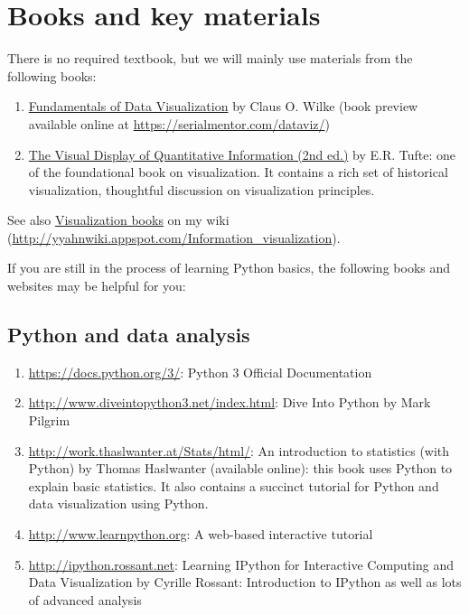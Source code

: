 \documentclass[11pt,article,oneside]{memoir} %
\begin{document}
\section{Books and key materials}%

There is no required textbook, but we will mainly use materials from the following books:

\begin{enumerate}
    
\item \href{https://serialmentor.com/dataviz/}{Fundamentals of Data Visualization} by Claus O. Wilke (book preview available online at \url{https://serialmentor.com/dataviz/})

\item \href{http://www.amazon.com/gp/product/0961392142}{The Visual Display of Quantitative Information (2nd ed.)} by E.R. Tufte: one of the foundational book on visualization. It contains a rich set of historical visualization, thoughtful discussion on visualization principles. 

\end{enumerate}

See also \href{http://yyahnwiki.appspot.com/Information_visualization#h_6225eb5bf8a031f750a1b03f810ccc6a}{Visualization books} on my wiki (\url{http://yyahnwiki.appspot.com/Information_visualization}). 


If you are still in the process of learning Python basics, the following books and websites may be helpful for you:

\subsection{Python and data analysis}%

\begin{enumerate}%

\item \url{https://docs.python.org/3/}: Python 3 Official Documentation

\item \url{http://www.diveintopython3.net/index.html}: Dive Into Python by Mark Pilgrim 

\item \url{http://work.thaslwanter.at/Stats/html/}: An introduction to statistics (with Python) by Thomas Haslwanter (available online): this book uses Python to explain basic statistics. It also contains a succinct tutorial for Python and data visualization using Python. 

\item \url{http://www.learnpython.org}: A web-based interactive tutorial 

\item \url{http://ipython.rossant.net}: Learning IPython for Interactive Computing and Data Visualization by Cyrille Rossant: Introduction to IPython as well as lots of advanced analysis 

\end{enumerate}%
\end{document}
